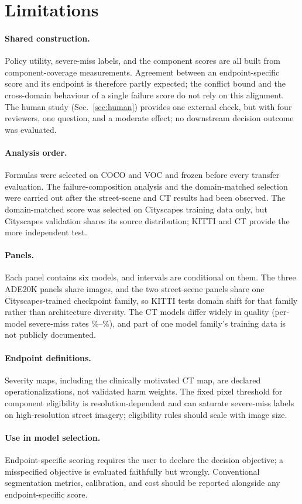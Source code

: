 \section{Limitations}

\paragraph{Shared construction.} Policy utility, severe-miss labels, and the
component scores are all built from component-coverage measurements. Agreement
between an endpoint-specific score and its endpoint is therefore partly
expected; the conflict bound and the cross-domain behaviour of a single failure
score do not rely on this alignment. The human study (Sec.~\ref{sec:human})
provides one external check, but with four reviewers, one question, and a
moderate effect; no downstream decision outcome was evaluated.

\paragraph{Analysis order.} Formulas were selected on COCO and VOC and frozen
before every transfer evaluation. The failure-composition analysis and the
domain-matched selection were carried out after the street-scene and CT
results had been observed. The domain-matched score was selected on Cityscapes
training data only, but Cityscapes validation shares its source distribution;
KITTI and CT provide the more independent test.

\paragraph{Panels.} Each panel contains six models, and intervals are
conditional on them. The three ADE20K panels share images, and the two
street-scene panels share one Cityscapes-trained checkpoint family, so KITTI
tests domain shift for that family rather than architecture diversity. The CT
models differ widely in quality (per-model severe-miss rates
\NAmosSevRateMin\%--\NAmosSevRateMax\%), and part of one model family's training
data is not publicly documented.

\paragraph{Endpoint definitions.} Severity maps, including the clinically
motivated CT map, are declared operationalizations, not validated harm weights.
The fixed pixel threshold for component eligibility is resolution-dependent and
can saturate severe-miss labels on high-resolution street imagery; eligibility
rules should scale with image size.

\paragraph{Use in model selection.} Endpoint-specific scoring requires the user
to declare the decision objective; a misspecified objective is evaluated
faithfully but wrongly. Conventional segmentation metrics, calibration, and
cost should be reported alongside any endpoint-specific score.
